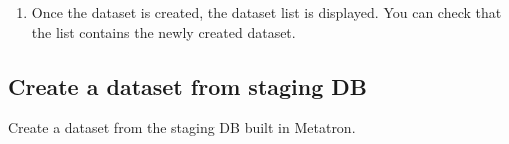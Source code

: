 \documentclass[letterpaper,10pt,english]{sphinxmanual}
\begin{document}
\begin{enumerate}
\begin{quote}
\begin{figure}[H]
\centering

\noindent{}
\end{figure}
\end{quote}

\item {} 
Once the dataset is created, the dataset list is displayed. You can check that the list contains the newly created dataset.
\begin{quote}

\begin{figure}[H]
\centering

\noindent{}
\end{figure}
\end{quote}

\end{enumerate}


\subsection{Create a dataset from staging DB}
\label{\detokenize{discovery/part07/create_a_dataset:staging-db}}\label{\detokenize{discovery/part07/create_a_dataset:create-a-dataset-of-stagingdb}}
Create a dataset from the staging DB built in Metatron.
\end{document}
